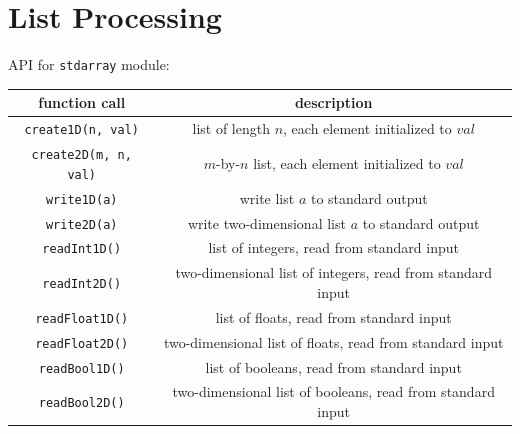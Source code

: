 \documentclass[8pt,a4paper,compress,handout]{beamer}
\begin{document}
\section{List Processing}
\begin{frame}[fragile]
API for \lstinline{stdarray} module:
\begin{center}
\begin{tabular}{cc}
function call & description \\ \hline
\lstinline$create1D(n, val)$ & list of length $n$, each element initialized to $val$ \\
\lstinline$create2D(m, n, val)$ & $m$-by-$n$ list, each element initialized to $val$ \\
\lstinline$write1D(a)$ & write list $a$ to standard output \\
\lstinline$write2D(a)$ & write two-dimensional list $a$ to standard output \\
\lstinline$readInt1D()$ & list of integers, read from standard input \\
\lstinline$readInt2D()$ & two-dimensional list of integers, read from standard input \\
\lstinline$readFloat1D()$ & list of floats, read from standard input \\
\lstinline$readFloat2D()$ & two-dimensional list of floats, read from standard input \\
\lstinline$readBool1D()$ & list of booleans, read from standard input \\
\lstinline$readBool2D()$ & two-dimensional list of booleans, read from standard input
\end{tabular} 
\end{center}
\end{frame}
\end{document}
